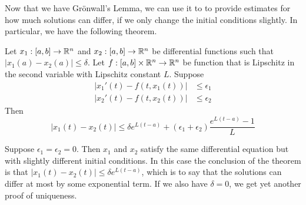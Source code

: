Now that we have Grönwall's Lemma, we can use it to to provide estimates for how much solutions can differ, if we only change the initial conditions slightly. In particular, we have the following theorem.
\begin{theorem}\label{thm:sim-init-conds}
    Let $x_1: [a, b] \to \mathbb{R}^n$ and $x_2: [a, b] \to \mathbb{R}^n$ be differential functions such that $|x_1(a) - x_2(a)| \leq \delta$. Let $f: [a, b] \times \mathbb{R}^n \to \mathbb{R}^n$ be function that is Lipschitz in the second variable with Lipschitz constant $L$. Suppose
    \begin{align*}
        |x_1'(t) - f(t, x_1(t))| &\leq \epsilon_1\\
        |x_2'(t) - f(t, x_2(t))| &\leq \epsilon_2
    \end{align*}
    Then
    $$ |x_1(t) - x_2(t)| \leq \delta e^{L(t - a)} + (\epsilon_1 + \epsilon_2) \frac{e^{L(t - a)} - 1}{L} $$
\end{theorem}
\begin{remark}
Suppose $\epsilon_1 = \epsilon_2 = 0$. Then $x_1$ and $x_2$ satisfy the same differential equation but with slightly different initial conditions. In this case the conclusion of the theorem is that $|x_1(t) - x_2(t)| \leq \delta e^{L(t - a)}$, which is to say that the solutions can differ at most by some exponential term. If we also have $\delta = 0$, we get yet another proof of uniqueness.
\end{remark}
